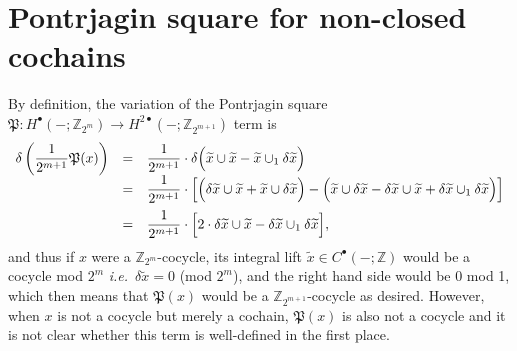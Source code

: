 \documentclass[12pt]{article}
\numberwithin{equation}{section}
\def\bZ{\mathbb{Z}}
\def\fP{\mathfrak{P}}
\begin{document}
\section{Pontrjagin square for non-closed cochains}
By definition, the variation of the Pontrjagin square $\fP : H^\bullet(-;\bZ_{2^m}) \to H^{2\bullet}(-;\bZ_{2^{m+1}})$ term is
\begin{equation}
	\label{deltaPontrjagin}
	\begin{array}{ccl}
		\delta \left(\dfrac{1}{2^{m+1}}\fP(x)\right)
		& = & \dfrac{1}{2^{m+1}}\cdot \delta \Big(\widetilde x \cup \widetilde x - \widetilde x \cup_1 \delta \widetilde x\Big)\\
		& = & \dfrac{1}{2^{m+1}}\cdot\left[\Big(\delta \widetilde x \cup \widetilde x + \widetilde x \cup \delta \widetilde x\Big)
				- \Big(\widetilde x \cup \delta \widetilde x - \delta \widetilde x \cup \widetilde x + \delta \widetilde x \cup_1 \delta \widetilde x\Big)\right]\vspace{2mm}\\
		& = & \dfrac{1}{2^{m+1}}\cdot\Big[2\cdot \delta \widetilde x \cup \widetilde x - \delta \widetilde x \cup_1 \delta \widetilde x\Big],\\
	\end{array}
\end{equation}
and thus if $x$ were a $\bZ_{2^m}$-cocycle, 
its integral lift $\widetilde x \in C^\bullet(-;\bZ)$ would be a cocycle mod $2^m$ \textit{i.e.}~$\delta \widetilde x = 0$ (mod $2^m$),
and the right hand side would be $0$ mod 1,
which then means that $\fP(x)$ would be a $\bZ_{2^{m+1}}$-cocycle as desired.
However, when $x$ is not a cocycle but merely a cochain,
$\fP(x)$ is also not a cocycle and it is not clear whether this term is well-defined in the first place.
\end{document}
